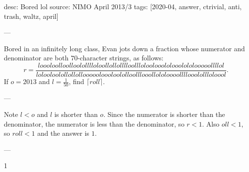 desc: Bored lol
source: NIMO April 2013/3
tags: [2020-04, answer, ctrivial, anti, trash, waltz, april]

---

Bored in an infinitely long class, Evan jots down a fraction whose numerator and denominator are both $70$-character strings, as follows: \[r=\frac{loooloolloolloololllloloollollolllloollloloolooololooolololooooollllol}
{lolooloolollollolloooooloooloololloolllooollololoooollllooolollloloool}.\]
If $o=2013$ and $l=\frac1{50}$, find $\lceil roll\rceil$.

---

Note $l<o$ and $l$ is shorter than $o$. Since the numerator is shorter than the denominator, the numerator is less than the denominator, so $r<1$. Also $oll<1$, so $roll<1$ and the answer is $1$.

---

1
